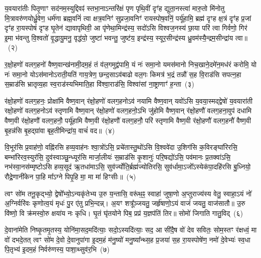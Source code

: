 य॒वयारा॑तीः पितृ॒णाꣳ सद॑नम॒स्युद्दिवꣴ॑ स्तभा॒ना\-ऽन्तरि॑क्षं पृण पृथि॒वीं दृꣳ॑ह द्युता॒नस्त्वा॑ मारु॒तो मि॑नोतु मि॒त्रावरु॑णयोर्ध्रु॒वेण॒ धर्म॑णा ब्रह्म॒वनिं॑ त्वा क्षत्र॒वनिꣳ॑ सुप्रजा॒वनिꣳ॑ रायस्पोष॒वनिं॒ पर्यू॑हामि॒ ब्रह्म॑ दृꣳह क्ष॒त्रं दृꣳ॑ह प्र॒जां दृꣳ॑ह रा॒यस्पोषं॑ दृꣳह घृ॒तेन॑ द्यावा\-पृथिवी॒ आ पृ॑णेथा॒मिन्द्र॑स्य॒ सदो॑\-ऽसि विश्वज॒नस्य॑ छा॒या परि॑ त्वा गिर्वणो॒ गिर॑ इ॒मा भ॑वन्तु वि॒श्वतो॑ वृ॒द्धायु॒मनु॒ वृद्ध॑यो॒ जुष्टा॑ भवन्तु॒ जुष्ट॑य॒ इन्द्र॑स्य॒ स्यूर॒सीन्द्र॑स्य ध्रु॒वम॑स्यै॒न्द्रम॒सीन्द्रा॑य त्वा॥~(२)\ip

{\anuvakamend[{द्वेष॑ इ॒मा अ॒ष्टाद॑श च}]}

र॒क्षो॒हणो॑ वलग॒हनो॑ वैष्ण॒वान्ख॑नामी॒दम॒हं तं व॑ल॒गमुद्व॑पामि॒ यं नः॑ समा॒नो यमस॑मानो निच॒खाने॒दमे॑न॒मध॑रं करोमि॒ यो नः॑ समा॒नो यो\-ऽस॑मानो\-ऽराती॒यति॑ गाय॒त्रेण॒ छन्द॒सा\-ऽव॑बाढो वल॒गः किमत्र॑ भ॒द्रं तन्नौ॑ स॒ह वि॒राड॑सि सपत्न॒हा स॒म्राड॑सि भ्रातृव्य॒हा स्व॒राड॑स्यभिमाति॒हा वि॑श्वा॒राड॑सि॒ विश्वा॑सां ना॒ष्ट्राणाꣳ॑ ह॒न्ता~(३)\ip

र॑क्षो॒हणो॑ वलग॒हनः॒ प्रोक्षा॑मि वैष्ण॒वान् र॑क्षो॒हणो॑ वलग॒हनो\-ऽव॑ नयामि वैष्ण॒वान् यवो॑\-ऽसि य॒वया॒स्मद्द्वेषो॑ य॒वयारा॑ती रक्षो॒हणो॑ वलग॒हनो\-ऽव॑ स्तृणामि वैष्ण॒वान् र॑क्षो॒हणो॑ वलग॒हनो॒\-ऽभि जु॑होमि वैष्ण॒वान् र॑क्षो॒हणौ॑ वलग॒हना॒वुप॑ दधामि वैष्ण॒वी र॑क्षो॒हणौ॑ वलग॒हनौ॒ पर्यू॑हामि वैष्ण॒वी र॑क्षो॒हणौ॑ वलग॒हनौ॒ परि॑ स्तृणामि वैष्ण॒वी र॑क्षो॒हणौ॑ वलग॒हनौ॑ वैष्ण॒वी बृ॒हन्न॑सि बृ॒हद्ग्रा॑वा बृह॒तीमिन्द्रा॑य॒ वाचं॑ वद॥~(४)\ip

{\anuvakamend[{ह॒न्तेन्द्रा॑य॒ द्वे च॑}]}

वि॒भूर॑सि प्र॒वाह॑णो॒ वह्नि॑रसि हव्य॒वाह॑नः श्वा॒त्रो॑\-ऽसि॒ प्रचे॑तास्तु॒थो॑\-ऽसि वि॒श्ववे॑दा उ॒शिग॑सि क॒विरङ्घा॑रिरसि॒ बम्भा॑रिरव॒स्युर॑सि॒ दुव॑स्वाञ्छु॒न्ध्यूर॑सि मार्जा॒लीयः॑ स॒म्राड॑सि कृ॒शानुः॑ परि॒षद्यो॑\-ऽसि॒ पव॑मानः प्र॒तक्वा॑\-ऽसि॒ नभ॑स्वा॒नस॑म्मृष्टो\-ऽसि हव्य॒सूद॑ ऋ॒तधा॑मा\-ऽसि॒ सुव॑र्ज्योति॒र्ब्रह्म॑ज्योतिरसि॒ सुव॑र्धामा॒\-ऽजो᳚\-ऽस्येक॑पा॒दहि॑रसि बु॒ध्नियो॒ रौद्रे॒णानी॑केन पा॒हि मा᳚\-ऽग्ने पिपृ॒हि मा॒ मा मा॑ हिꣳसीः॥~(५)\ip

{\anuvakamend[{अनी॑केना॒ष्टौ च॑}]}

त्वꣳ सो॑म तनू॒कृद्भ्यो॒ द्वेषो᳚भ्यो॒\-ऽन्यकृ॑तेभ्य उ॒रु य॒न्तासि॒ वरू॑थ॒ꣴ॒ स्वाहा॑ जुषा॒णो अ॒प्तुराज्य॑स्य वेतु॒ स्वाहा॒\-ऽयं नो॑ अ॒ग्निर्वरि॑वः कृणोत्व॒यं मृधः॑ पु॒र ए॑तु प्रभि॒न्दन्न्। अ॒यꣳ शत्रू᳚ञ्जयतु॒ जर्\mbox{}हृ॑षाणो॒\-ऽयं वाजं॑ जयतु॒ वाज॑सातौ॥ उ॒रु वि॑ष्णो॒ वि क्र॑मस्वो॒रु क्षया॑य नः कृधि। घृ॒तं घृ॑तयोने पिब॒ प्रप्र॑ य॒ज्ञप॑तिं तिर॥ सोमो॑ जिगाति गातु॒विद्~(६)\ip

दे॒वाना॑मेति निष्कृ॒तमृ॒तस्य॒ योनि॑मा॒सद॒मदि॑त्याः॒ सदो॒\-ऽस्यदि॑त्याः॒ सद॒ आ सी॑दै॒ष वो॑ देव सवितः॒ सोम॒स्तꣳ र॑क्षध्वं॒ मा वो॑ दभदे॒तत् त्वꣳ सो॑म दे॒वो दे॒वानुपा॑गा इ॒दम॒हं म॑नु॒ष्यो॑ मनु॒ष्या᳚न्थ्स॒ह प्र॒जया॑ स॒ह रा॒यस्पोषे॑ण॒ नमो॑ दे॒वेभ्यः॑ स्व॒धा पि॒तृभ्य॑ इ॒दम॒हं निर्वरु॑णस्य॒ पाशा॒थ्सुव॑र॒भि~(७)\ip

